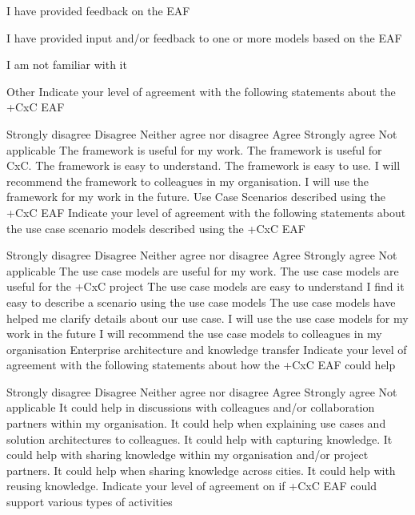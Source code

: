 I have provided feedback on the EAF

I have provided input and/or feedback to one or more models based on the EAF

I am not familiar with it

Other
Indicate your level of agreement with the following statements about the +CxC EAF
 
Strongly disagree
Disagree
Neither agree nor disagree
Agree
Strongly agree
Not applicable
The framework is useful for my work.
The framework is useful for CxC.
The framework is easy to understand.
The framework is easy to use.
I will recommend the framework to colleagues in my organisation.
I will use the framework for my work in the future.
Use Case Scenarios described using the +CxC EAF
Indicate your level of agreement with the following statements about the use case scenario models described using the +CxC EAF
 
Strongly disagree
Disagree
Neither agree nor disagree
Agree
Strongly agree
Not applicable
The use case models are useful for my work.
The use case models are useful for the +CxC project
The use case models are easy to understand
I find it easy to describe a scenario using the use case models
The use case models have helped me clarify details about our use case.
I will use the use case models for my work in the future
I will recommend the use case models to colleagues in my organisation
Enterprise architecture and knowledge transfer
Indicate your level of agreement with the following statements about how the +CxC EAF could help
 
Strongly disagree
Disagree
Neither agree nor disagree
Agree
Strongly agree
Not applicable
It could help in discussions with colleagues and/or collaboration partners within my organisation.
It could help when explaining use cases and solution architectures to colleagues.
It could help with capturing knowledge.
It could help with sharing knowledge within my organisation and/or project partners.
It could help when sharing knowledge across cities.
It could help with reusing knowledge.
Indicate your level of agreement on if +CxC EAF could support various types of activities
 
